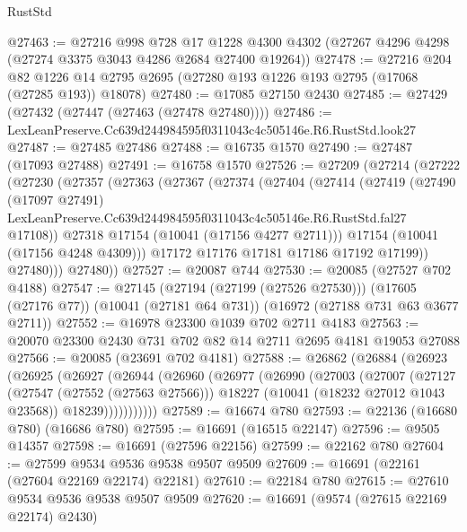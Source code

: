 \begin{lexlean}{RustStd}
\begin{coremodule}
@27463 := @27216
    @998
    @728
    @17
    @1228
    @4300
    @4302
    (@27267 @4296 @4298 (@27274 @3375 @3043 @4286 @2684 @27400 @19264))
@27478 := @27216
    @204
    @82
    @1226
    @14
    @2795
    @2695
    (@27280 @193 @1226 @193 @2795 (@17068 (@27285 @193)) @18078)
@27480 := @17085 @27150 @2430
@27485 := @27429 (@27432 (@27447 (@27463 (@27478 @27480))))
@27486 := LexLeanPreserve.Cc639d244984595f0311043c4c505146e.R6.RustStd.look27
@27487 := @27485 @27486
@27488 := @16735 @1570
@27490 := @27487 (@17093 @27488)
@27491 := @16758 @1570
@27526 := @27209
    (@27214
      (@27222
        (@27230
          (@27357
            (@27363
              (@27367
                (@27374
                  (@27404
                    (@27414
                      (@27419
                        (@27490
                          (@17097 @27491)
                          LexLeanPreserve.Cc639d244984595f0311043c4c505146e.R6.RustStd.fal27
                          @17108))
                      @27318
                      @17154
                      (@10041 (@17156 @4277 @2711)))
                    @17154
                    (@10041 (@17156 @4248 @4309)))
                  @17172
                  @17176
                  @17181
                  @17186
                  @17192
                  @17199))
              @27480)))
        @27480))
@27527 := @20087 @744
@27530 := @20085 (@27527 @702 @4188)
@27547 := @27145
    (@27194 (@27199 (@27526 @27530)))
    (@17605 (@27176 @77))
    (@10041 (@27181 @64 @731))
    (@16972 (@27188 @731 @63 @3677 @2711))
@27552 := @16978 @23300 @1039 @702 @2711 @4183
@27563 := @20070 @23300 @2430 @731 @702 @82 @14 @2711 @2695 @4181 @19053 @27088
@27566 := @20085 (@23691 @702 @4181)
@27588 := @26862
    (@26884
      (@26923
        (@26925
          (@26927
            (@26944
              (@26960
                (@26977
                  (@26990
                    (@27003
                      (@27007
                        (@27127
                          (@27547 (@27552 (@27563 @27566)))
                          @18227
                          (@10041 (@18232 @27012 @1043 @23568))
                          @18239)))))))))))
@27589 := @16674 @780
@27593 := @22136 (@16680 @780) (@16686 @780)
@27595 := @16691 (@16515 @22147)
@27596 := @9505 @14357
@27598 := @16691 (@27596 @22156)
@27599 := @22162 @780
@27604 := @27599 @9534 @9536 @9538 @9507 @9509
@27609 := @16691 (@22161 (@27604 @22169 @22174) @22181)
@27610 := @22184 @780
@27615 := @27610 @9534 @9536 @9538 @9507 @9509
@27620 := @16691 (@9574 (@27615 @22169 @22174) @2430)

\end{coremodule}
\end{lexlean}
